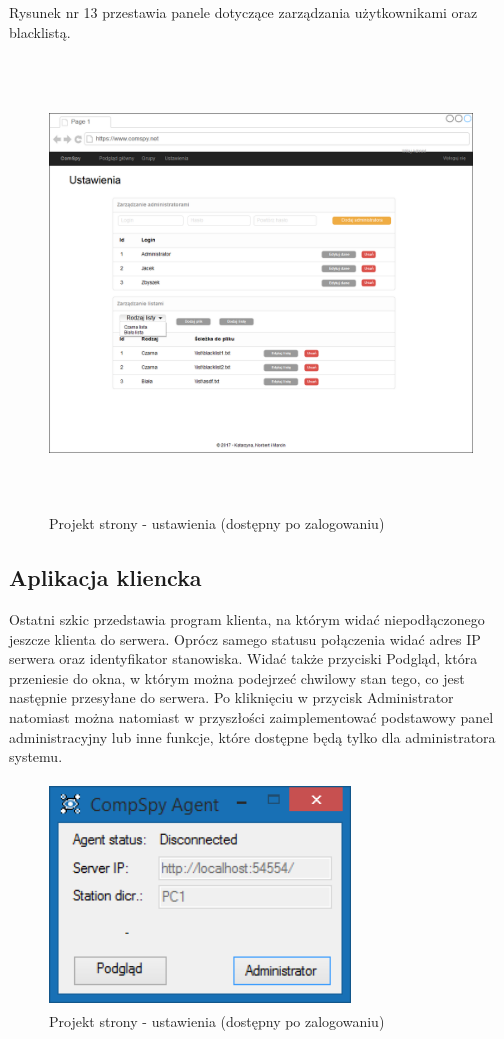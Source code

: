\newpage
Rysunek nr 13 przestawia panele dotyczące zarządzania użytkownikami oraz blacklistą.
\begin{figure} [!ht]
    \centering
    \includegraphics[height=12cm,width=15cm]{interfejs_ustawienia}
    \caption{Projekt strony - ustawienia (dostępny po zalogowaniu)}
    \label{fig:my_label}
\end{figure}


\newpage

\subsection{Aplikacja kliencka}
Ostatni szkic przedstawia program klienta, na którym widać niepodłączonego jeszcze klienta do serwera. Oprócz samego statusu połączenia widać adres IP serwera oraz identyfikator stanowiska. Widać także przyciski Podgląd, która przeniesie do okna, w którym można podejrzeć chwilowy stan tego, co jest następnie przesyłane do serwera. Po kliknięciu w przycisk Administrator natomiast można natomiast w przyszłości zaimplementować podstawowy panel administracyjny lub inne funkcje, które dostępne będą tylko dla administratora systemu.


\begin{figure} [!ht]
    \centering
    \includegraphics[height=6cm,width=8cm]{interfejs_agent}
    \caption{Projekt strony - ustawienia (dostępny po zalogowaniu)}
    \label{fig:my_label}
\end{figure}